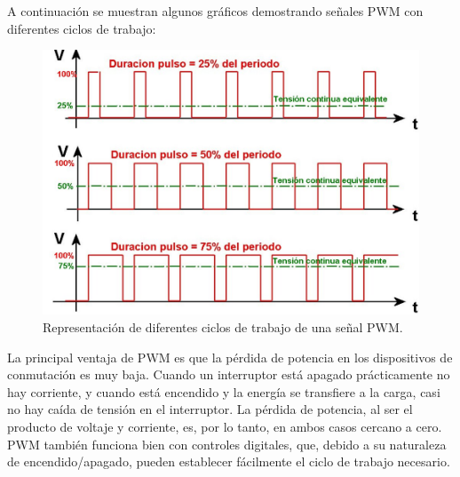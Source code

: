 A continuación se muestran algunos gráficos demostrando señales PWM con diferentes ciclos de trabajo:\\

\begin{figure}[H]
  \begin{center}
    \includegraphics[scale=0.4]{imagenes/pwm.png}
  \end{center}
  \caption{Representación de diferentes ciclos de trabajo de una señal PWM.}
  \label{figura:sensor_dth11_bits}
\end{figure}

La principal ventaja de PWM es que la pérdida de potencia en los dispositivos de conmutación es muy baja. Cuando un interruptor está apagado prácticamente no hay corriente, y 
cuando está encendido y la energía se transfiere a la carga, casi no hay caída de tensión en el interruptor. La pérdida de potencia, al ser el producto de voltaje y corriente, es,
por lo tanto, en ambos casos cercano a cero. PWM también funciona bien con controles digitales, que, debido a su naturaleza de encendido/apagado, pueden establecer fácilmente el 
ciclo de trabajo necesario.\\



